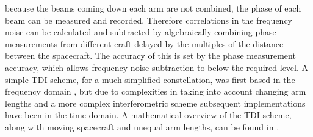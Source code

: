 \documentclass{article}
\begin{document}
because the beams coming down each arm are not combined, the phase of each beam can
be measured and recorded. Therefore correlations in the frequency noise can be
calculated and subtracted by algebraically combining phase measurements from
different craft delayed by the multiples of the distance between the spacecraft.
The accuracy of this is set by the phase measurement accuracy, which allows
frequency noise subtraction to below the required level. A simple TDI scheme,
for a much simplified constellation, was first based in the frequency domain
\cite{Giampieri}, but due to complexities in taking into account changing arm
lengths and a more complex interferometric scheme subsequent implementations have
been in the time domain. A mathematical overview of the TDI scheme, along with
moving spacecraft and unequal arm lengths, can be found in \cite{Tinto:2005}.
\end{document}
